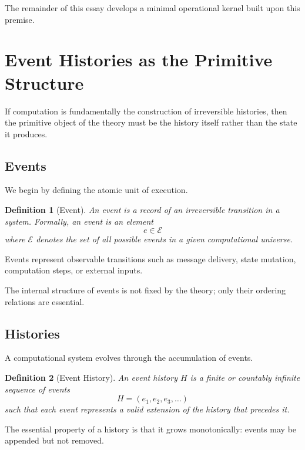 \documentclass[12pt]{article}
\newtheorem{definition}{Definition}
\begin{document}
The remainder of this essay develops a minimal operational
kernel built upon this premise.


\section{Event Histories as the Primitive Structure}

If computation is fundamentally the construction of irreversible
histories, then the primitive object of the theory must be
the history itself rather than the state it produces.

\subsection{Events}

We begin by defining the atomic unit of execution.

\begin{definition}[Event]
An \emph{event} is a record of an irreversible transition in a system.
Formally, an event is an element
\[
e \in \mathcal{E}
\]
where $\mathcal{E}$ denotes the set of all possible events
in a given computational universe.
\end{definition}

Events represent observable transitions such as message delivery,
state mutation, computation steps, or external inputs.

The internal structure of events is not fixed by the theory;
only their ordering relations are essential.

\subsection{Histories}

A computational system evolves through the accumulation of events.

\begin{definition}[Event History]
An \emph{event history} $H$ is a finite or countably infinite
sequence of events
\[
H = (e_1, e_2, e_3, \dots)
\]
such that each event represents a valid extension
of the history that precedes it.
\end{definition}

The essential property of a history is that it grows monotonically:
events may be appended but not removed.
\end{document}
